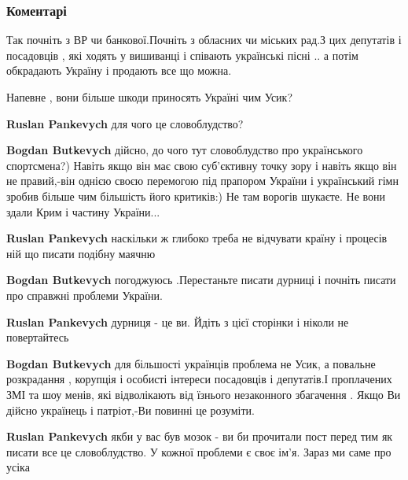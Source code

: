  
 
 
 
 
\subsubsection{Коментарі}

\begin{itemize} %

Так почніть з ВР чи банкової.Почніть з обласних чи міських рад.З цих депутатів
і посадовців , які ходять у вишиванці і співають українські пісні .. а потім
обкрадають Україну і продають все що можна.

Напевне , вони більше шкоди приносять Україні чим Усик?

\begin{itemize} %
\textbf{Ruslan Pankevych} для чого це словоблудство?

\textbf{Bogdan Butkevych} дійсно, до чого тут словоблудство про українського спортсмена?)
Навіть якщо він має свою суб’єктивну точку зору і навіть якщо він не правий,-він однією своєю перемогою під прапором України і український гімн зробив більше чим більшість його критиків:)
Не там ворогів шукаєте. Не вони здали Крим і частину України...


\textbf{Ruslan Pankevych} наскільки ж глибоко треба не відчувати країну і процесів ній що писати подібну маячню

\textbf{Bogdan Butkevych} погоджуюсь .Перестаньте писати дурниці і почніть писати про справжні проблеми України.


\textbf{Ruslan Pankevych} дурниця - це ви. Йдіть з цієї сторінки і ніколи не повертайтесь

\textbf{Bogdan Butkevych} для більшості українців проблема не Усик, а повальне розкрадання , корупція і особисті інтереси посадовців і депутатів.І проплачених ЗМІ та шоу менів, які відволікають від їзнього незаконного збагачення .
Якщо Ви дійсно українець і патріот,-Ви повинні це розуміти.


\textbf{Ruslan Pankevych} якби у вас був мозок - ви би прочитали пост перед тим як писати все це словоблудство. У кожної проблеми є своє ім'я. Зараз ми саме про усіка


\end{itemize}
\end{itemize}
